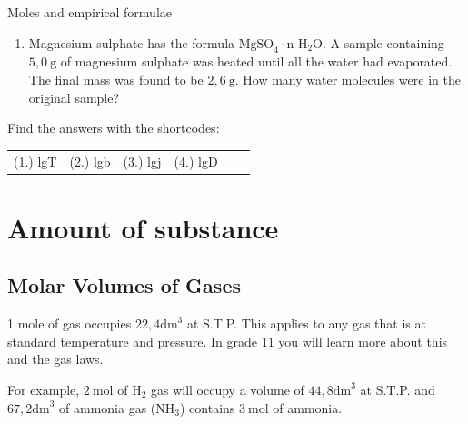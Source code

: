 \begin{exercises}{Moles and empirical formulae
      }
\begin{enumerate}[noitemsep, label=\textbf{\arabic*}. ]
\item Magnesium sulphate has the formula $\text{MgSO}_{4} \cdot \text{n H}_{2}\text{O}$. A sample containing $5,0 ~\text{g}$ of magnesium sulphate was heated until all the water had evaporated. The final mass was found to be $2,6~\text{g}$. How many water molecules were in the original sample?
\end{enumerate}
    \label{m38712*cid7}
\par {} Find the answers with the shortcodes:
 \par \begin{tabular}[h]{cccccc}
 (1.) lgT  &  (2.) lgb  &  (3.) lgj  &  (4.) lgD  & \end{tabular}
\end{exercises}
\section{Amount of substance}
            \subsection*{Molar Volumes of Gases}
            \nopagebreak
            \par
            \label{m38712*eip-id1168064596799}
  { \label{m38712*eip-id1168053572222}1 mole of gas occupies $22,4{\text{dm}}^{3}$ at S.T.P. } 
      \label{m38712*id282112}This applies to any gas that is at standard temperature and pressure. In grade 11 you will learn more about this and the gas laws.\par 
For example, $2~\text{mol}$ of $\text{H}_2$ gas will occupy a volume of $44,8{\text{dm}}^{3}$ at S.T.P. and $67,2{\text{dm}}^{3}$ of ammonia gas ($\text{NH}_3$) contains $3~\text{mol}$ of ammonia.
    \label{m38712*cid8}
